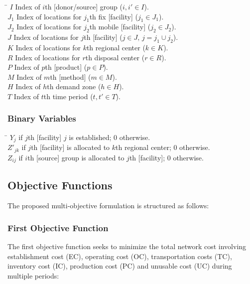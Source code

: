 \documentclass[10pt,twocolumn]{article}
\begin{document}
\begin{tabbing}
  \hspace{1.8cm}\= \kill
  $I$     \> Index of $i$th [donor/source] group ($i, i' \in I$).\\
  $J_1$   \> Index of locations for $j_1$th fix [facility]
             ($j_1 \in J_1$).\\
  $J_2$   \> Index of locations for $j_2$th mobile [facility]
             ($j_2 \in J_2$).\\
  $J$     \> Index of locations for $j$th [facility]
             ($j \in J,\, j = j_1 \cup j_2$).\\
  $K$     \> Index of locations for $k$th regional center
             ($k \in K$).\\
  $R$     \> Index of locations for $r$th disposal center
             ($r \in R$).\\
  $P$     \> Index of $p$th [product] ($p \in P$).\\
  $M$     \> Index of $m$th [method] ($m \in M$).\\
  $H$     \> Index of $h$th demand zone ($h \in H$).\\
  $T$     \> Index of $t$th time period ($t, t' \in T$).
\end{tabbing}

\subsubsection{Binary Variables}

\begin{tabbing}
  \hspace{1.8cm}\= \kill
  $Y_j$     if $j$th [facility] $j$ is established; 0
              otherwise.\\
  $Z'_{jk}$ if $j$th [facility] is allocated to $k$th regional
              center; 0 otherwise.\\
  $Z_{ij}$  if $i$th [source] group is allocated to $j$th
              [facility]; 0 otherwise.
\end{tabbing}

\subsection{Objective Functions}

The proposed multi-objective formulation is structured as follows:

\subsubsection{First Objective Function}
The first objective function seeks to minimize the total network
cost involving establishment cost (EC), operating cost (OC),
transportation costs (TC), inventory cost (IC), production cost
(PC) and unusable cost (UC) during multiple periods:
\end{document}
